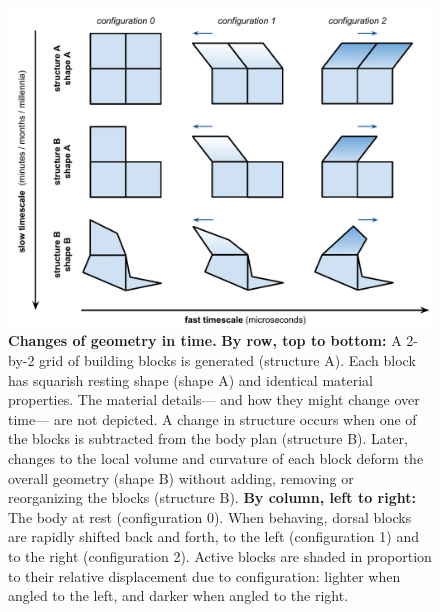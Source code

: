 \begin{enumerate}
    
    \begin{figure}[H]
        \centering
        \vspace{-8pt}
        \includegraphics[width=0.9\linewidth]{fig/ontology.pdf}
        \caption{%
        \textbf{Changes of geometry in time.}
        \textbf{By row, top to bottom:}
        A 2-by-2 grid of building blocks is generated (structure A).
        Each block has squarish resting shape (shape A) and identical material properties.
        The material details---%
        and how they might change over time---%
        are not depicted.
        A change in structure occurs when one of the blocks is subtracted from the body plan (structure B).
        Later, changes to the local volume and curvature of each block deform the overall geometry (shape B) without adding, removing or reorganizing the blocks (structure B).
        \textbf{By column, left to right:}
        The body at rest (configuration 0).
        When behaving, dorsal blocks are rapidly shifted back and forth, to the left (configuration 1) and to the right (configuration 2).
        Active blocks are shaded in proportion to their relative displacement due to configuration: lighter when angled to the left, and darker when angled to the right.
        \label{fig:ontology}%
        }
    \end{figure}
    

\end{enumerate}
